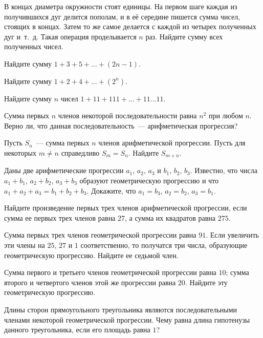 \begin{problems}

\item
В концах диаметра окружности стоят единицы.
На первом шаге каждая из получившихся дуг делится пополам, и в её середине пишется
сумма чисел, стоящих в концах.
Затем то же самое делается с каждой из четырех полученных дуг и~т.~д.
Такая операция проделывается $n$ раз. Найдите сумму всех полученных чисел.

\item
Найдите сумму $1 + 3 + 5 + \ldots + (2 n - 1)$.

\item
Найдите сумму $1 + 2 + 4 + \ldots + (2^n)$.

\item
Найдите сумму $n$ чисел $1 + 11 + 111 + \ldots + 11 \ldots 11$.

\item
Сумма первых $n$ членов некоторой последовательности равна $n^2$ при любом $n$.
Верно ли, что данная последовательность~--- арифметическая прогрессия?

\item
Пусть $S_n$~--- сумма первых $n$ членов арифметической прогрессии.
Пусть для некоторых $m \neq n$ справедливо $S_m = S_n$.
Найдите $S_{m + n}$.

\item
Даны две арифметические прогрессии $a_1$, $a_2$, $a_3$ и $b_1$, $b_2$, $b_3$.
Известно, что числа $a_1 + b_1$, $a_2 + b_2$, $a_3 + b_3$ образуют геометрическую
прогрессию и что $a_1 + a_2 + a_3 = b_1 + b_2 + b_3$.
Докажите, что $a_1 = b_3$, $a_2 = b_2$, $a_3 = b_1$.

\item
Найдите произведение первых трех членов арифметической прогрессии, если сумма ее первых
трех членов равна $27$, а сумма их квадратов равна $275$.

\item
Сумма первых трех членов геометрической прогрессии равна $91$.
Если увеличить эти члены на $25$, $27$ и $1$ соответственно, то получатся три числа,
образующие геометрическую прогрессию.
Найдите ее седьмой член.

\item
Сумма первого и третьего членов геометрической прогрессии равна $10$;
сумма второго и четвертого членов этой же прогрессии равна $20$.
Найдите эту геометрическую прогрессию.

\item
Длины сторон прямоугольного треугольника являются последовательными членами некоторой
геометрической прогрессии.
Чему равна длина гипотенузы данного треугольника, если его площадь равна $1$?


\end{problems}
